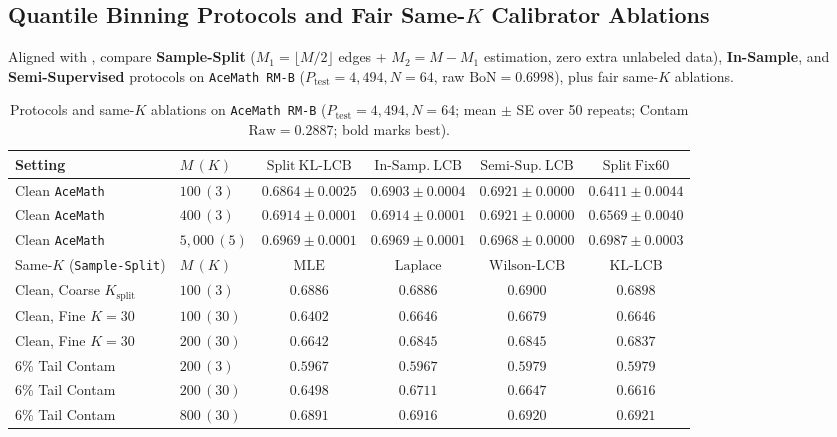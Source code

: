 \documentclass{article}
\theoremstyle{plain}
\theoremstyle{definition}
\theoremstyle{remark}
\begin{document}
\subsection{Quantile Binning Protocols and Fair Same-\texorpdfstring{$K$}{K} Calibrator Ablations}

Aligned with ,  compare \textbf{Sample-Split} ($M_1 = \lfloor M/2\rfloor$ edges + $M_2 = M - M_1$ estimation, zero extra unlabeled data), \textbf{In-Sample}, and \textbf{Semi-Supervised} protocols on \texttt{AceMath RM-B} ($P_{\mathrm{test}}=4{,}494, N=64$, raw $\mathrm{BoN}=0.6998$), plus fair same-$K$ ablations.

\begin{table}[t]
\centering
\caption{Protocols and same-$K$ ablations on \texttt{AceMath RM-B} ($P_{\mathrm{test}}=4{,}494, N=64$; mean $\pm$ SE over 50 repeats; Contam $\mathrm{Raw}=0.2887$; bold marks best).}
\label{tab:protocols}
\scriptsize
\setlength{\tabcolsep}{3.0pt}
\begin{tabular}{llcccc}
\toprule
Setting & $M\,(K)$ & $\mathrm{Split\ KL\text{-}LCB}$ & $\mathrm{In\text{-}Samp.\ LCB}$ & $\mathrm{Semi\text{-}Sup.\ LCB}$ & $\mathrm{Split\ Fix60}$ \\
\midrule
Clean \texttt{AceMath} & $100\,(3)$   & $0.6864 \pm 0.0025$ & $0.6903 \pm 0.0004$ & $\mathbf{0.6921 \pm 0.0000}$ & $0.6411 \pm 0.0044$ \\
Clean \texttt{AceMath} & $400\,(3)$   & $0.6914 \pm 0.0001$ & $0.6914 \pm 0.0001$ & $\mathbf{0.6921 \pm 0.0000}$ & $0.6569 \pm 0.0040$ \\
Clean \texttt{AceMath} & $5{,}000\,(5)$ & $0.6969 \pm 0.0001$ & $0.6969 \pm 0.0001$ & $0.6968 \pm 0.0000$ & $\mathbf{0.6987 \pm 0.0003}$ \\
\midrule
Same-$K$ (\texttt{Sample-Split}) & $M\,(K)$ & $\mathrm{MLE}$ & $\mathrm{Laplace}$ & $\mathrm{Wilson\text{-}LCB}$ & $\mathrm{KL\text{-}LCB}$ \\
\midrule
Clean, Coarse $K_{\mathrm{split}}$ & $100\,(3)$  & $0.6886$ & $0.6886$ & $\mathbf{0.6900}$ & $0.6898$ \\
Clean, Fine $K=30$                 & $100\,(30)$ & $0.6402$ & $0.6646$ & $\mathbf{0.6679}$ & $0.6646$ \\
Clean, Fine $K=30$                 & $200\,(30)$ & $0.6642$ & $\mathbf{0.6845}$ & $\mathbf{0.6845}$ & $0.6837$ \\
6\% Tail Contam                    & $200\,(3)$  & $0.5967$ & $0.5967$ & $\mathbf{0.5979}$ & $\mathbf{0.5979}$ \\
6\% Tail Contam                    & $200\,(30)$ & $0.6498$ & $\mathbf{0.6711}$ & $0.6647$ & $0.6616$ \\
6\% Tail Contam                    & $800\,(30)$ & $0.6891$ & $0.6916$ & $0.6920$ & $\mathbf{0.6921}$ \\
\bottomrule
\end{tabular}
\end{table}
\end{document}
